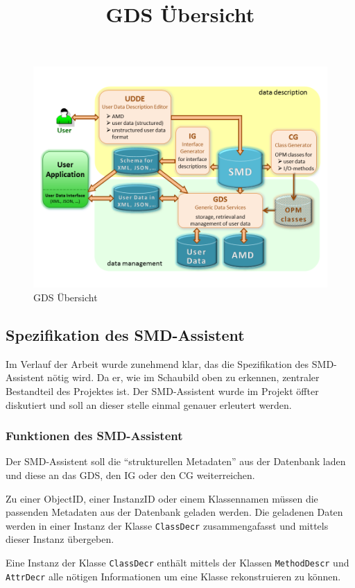 \begin{figure}[!ht]
\centering
\includegraphics[width=13.5cm]{Bilder/UebersichtGDS}
\title{GDS \"Ubersicht}
\caption{GDS \"Ubersicht}
\centering
\end{figure}

\FloatBarrier

\subsection{Spezifikation des SMD-Assistent}
Im Verlauf der Arbeit wurde zunehmend klar, das die Spezifikation des SMD-Assistent n\"otig wird. Da er, wie im Schaubild oben zu erkennen, zentraler Bestandteil des Projektes ist.
Der SMD-Assistent wurde im Projekt \"offter diskutiert und soll an dieser stelle einmal genauer erleutert werden.

\subsubsection{Funktionen des SMD-Assistent}
Der SMD-Assistent soll die "`strukturellen Metadaten"' aus der Datenbank laden und diese an das \ac{GDS}, den \ac{IG} oder den \ac{CG} weiterreichen. 

Zu einer ObjectID, einer InstanzID oder einem Klassennamen m\"ussen die passenden Metadaten aus der Datenbank geladen werden.
Die geladenen Daten werden in einer Instanz der Klasse \texttt{ClassDecr} zusammengafasst und mittels dieser Instanz \"ubergeben.

Eine Instanz der Klasse \texttt{ClassDecr} enth\"alt mittels der Klassen \texttt{MethodDescr} und \texttt{AttrDecr} alle n\"otigen Informationen um eine Klasse rekonstruieren zu k\"onnen.

